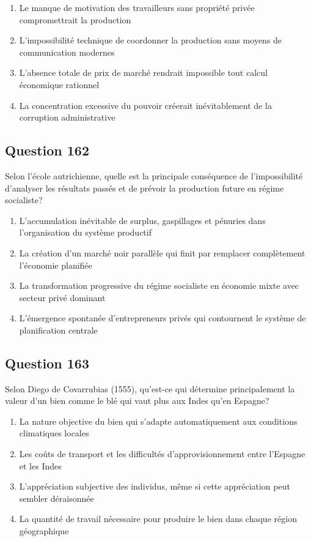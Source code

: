 \documentclass[12pt,a4paper]{article}
\begin{document}
\begin{enumerate}[label=\Alph*., leftmargin=*]
\item Le manque de motivation des travailleurs sans propriété privée compromettrait la production
\item L'impossibilité technique de coordonner la production sans moyens de communication modernes
\item L'absence totale de prix de marché rendrait impossible tout calcul économique rationnel
\item La concentration excessive du pouvoir créerait inévitablement de la corruption administrative
\end{enumerate}

\bigskip


\subsection*{Question 162}
Selon l'école autrichienne, quelle est la principale conséquence de l'impossibilité d'analyser les résultats passés et de prévoir la production future en régime socialiste?

\begin{enumerate}[label=\Alph*., leftmargin=*]
\item L'accumulation inévitable de surplus, gaspillages et pénuries dans l'organisation du système productif
\item La création d'un marché noir parallèle qui finit par remplacer complètement l'économie planifiée
\item La transformation progressive du régime socialiste en économie mixte avec secteur privé dominant
\item L'émergence spontanée d'entrepreneurs privés qui contournent le système de planification centrale
\end{enumerate}

\bigskip


\subsection*{Question 163}
Selon Diego de Covarrubias (1555), qu'est-ce qui détermine principalement la valeur d'un bien comme le blé qui vaut plus aux Indes qu'en Espagne?

\begin{enumerate}[label=\Alph*., leftmargin=*]
\item La nature objective du bien qui s'adapte automatiquement aux conditions climatiques locales
\item Les coûts de transport et les difficultés d'approvisionnement entre l'Espagne et les Indes
\item L'appréciation subjective des individus, même si cette appréciation peut sembler déraisonnée
\item La quantité de travail nécessaire pour produire le bien dans chaque région géographique
\end{enumerate}
\end{document}
